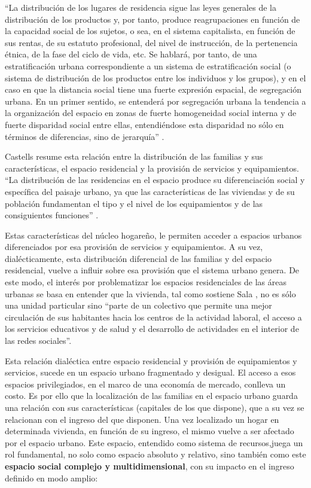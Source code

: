 “La distribución de los lugares de residencia sigue las leyes generales de la distribución de los productos y, por tanto, produce reagrupaciones en función de la capacidad social de los sujetos, o sea, en el sistema capitalista, en función de sus rentas, de su estatuto profesional, del nivel de instrucción, de la pertenencia étnica, de la fase del ciclo de vida, etc. Se hablará, por tanto, de una estratificación urbana correspondiente a un sistema de estratificación social (o sistema de distribución de los productos entre los individuos y los grupos), y en el caso en que la distancia social tiene una fuerte expresión espacial, de segregación urbana. En un primer sentido, se entenderá por segregación urbana la tendencia a la organización del espacio en zonas de fuerte homogeneidad social interna y de fuerte disparidad social entre ellas, entendiéndose esta disparidad no sólo en términos de diferencias, sino de jerarquía” \cite[~205]{castells}.

Castells resume esta relación entre la distribución de las familias y sus características, el espacio residencial y la provisión de servicios y equipamientos. “La distribución de las residencias en el espacio produce su diferenciación social y específica del paisaje urbano, ya que las características de las viviendas y de su población fundamentan el tipo y el nivel de los equipamientos y de las consiguientes funciones” \cite[p.~203]{castells}.

Estas características del núcleo hogareño, le permiten acceder a espacios urbanos diferenciados por esa provisión de servicios y equipamientos. A su vez, dialécticamente, esta distribución diferencial de las familias y del espacio residencial, vuelve a influir sobre esa provisión que el sistema urbano genera. De este modo, el interés por problematizar los espacios residenciales de las áreas urbanas se basa en entender que la vivienda, tal como sostiene Sala \citeyear{sala}, no es sólo una unidad particular sino “parte de un colectivo que permite una mejor circulación de sus habitantes hacia los centros de la actividad laboral, el acceso a los servicios educativos y de salud y el desarrollo de actividades en el interior de las redes sociales”.

Esta relación dialéctica entre espacio residencial y provisión de equipamientos y servicios, sucede en un espacio urbano fragmentado y desigual. El acceso a esos espacios privilegiados, en el marco de una economía de mercado, conlleva un costo. Es por ello que la localización de las familias en el espacio urbano guarda una relación con sus características (capitales de los que dispone), que a su vez se relacionan con el ingreso del que disponen. Una vez localizado un hogar en determinada vivienda, en función de su ingreso, el mismo vuelve a ser afectado por el espacio urbano. Este espacio, entendido como sistema de recursos,juega un rol fundamental, no solo como espacio absoluto y relativo, sino también como este \textbf{espacio social complejo y multidimensional}, con su impacto en el ingreso definido en modo amplio:

